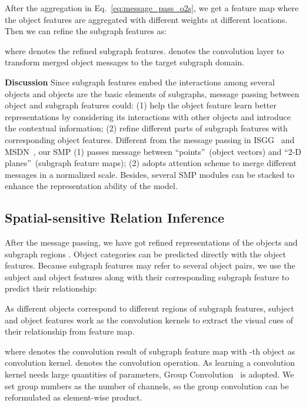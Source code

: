 \documentclass[runningheads]{llncs}
\begin{document}
After the aggregation in Eq.~\ref{eq:message_pass_o2s}, we get a feature map where the object features are aggregated with different weights at different locations. Then we can refine the subgraph features as:



\noindent where  denotes the refined subgraph features.  denotes the convolution layer to transform merged object messages to the target subgraph domain. 

\noindent\textbf{Discussion} Since subgraph features embed the interactions among several objects and objects are the basic elements of subgraphs, message passing between object and subgraph features could: (1) help the object feature learn better representations by considering its interactions with other objects and introduce the contextual information; (2) refine different parts of subgraph features with corresponding object features. 
Different from the message passing in ISGG~\cite{xu2017scene} and MSDN~\cite{li2017scene}, our SMP (1) passes message between ``points''~(object vectors) and ``2-D planes''~(subgraph feature maps); (2) adopts attention scheme to merge different messages in a normalized scale. 
Besides, several SMP modules can be stacked to enhance the representation ability of the model. 

\subsection{Spatial-sensitive Relation Inference}

After the message passing, we have got refined representations of the objects  and subgraph regions . Object categories can be predicted directly with the object features. Because subgraph features may refer to several object pairs, we use the subject and object features along with their corresponding subgraph feature to predict their relationship:


As different objects correspond to different regions of subgraph features, 
subject and object features work as the convolution kernels to extract the visual cues of their relationship from feature map. 

\noindent where  denotes the convolution result of subgraph feature map  with -th object as convolution kernel.  denotes the convolution operation. As learning a convolution kernel needs large quantities of parameters, Group Convolution~\cite{imagenet_hinton} is adopted. We set group numbers as the number of channels, so the group convolution can be reformulated as element-wise product. 
\end{document}
